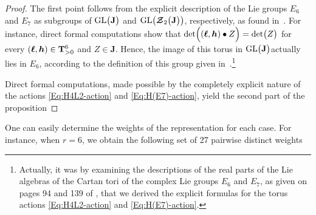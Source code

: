 \documentclass[11pt]{amsart}
\begin{document}
\begin{proof}%
The first point follows from the explicit description of the Lie groups $E_6 $ and $E_7$ as subgroups of 
${\rm GL}\big( \mathbf J\big)$  and 
${\rm GL}\big( \boldsymbol{\mathcal Z}_2\big(\mathbf J\big)\big)$, respectively, as found in~\cite{Yokota}. For instance, direct formal computations show that
$
{\rm det}\Big((\boldsymbol{\ell},\boldsymbol{h} )\bullet Z\Big)={\rm det}\big( 
Z\big)$ for every $(\boldsymbol{\ell},\boldsymbol{h} )\in {\bf T}_{>0}^6$ and $Z\in \mathbf J$. Hence, the image of this torus in ${\rm GL}\big( \mathbf J\big)$actually lies in $E_6$, according to the definition of this group given in~\cite[\S3.1]{Yokota}.\footnote{Actually, it was by examining the descriptions of the real parts of the Lie algebras of the Cartan tori of the complex Lie groups $ E_6$ and $ E_7$, as given on pages 94 and 139 of \cite{Yokota}, that we derived the explicit formulas for the torus actions \eqref{Eq:H4L2-action} 
and 
\eqref{Eq:H(E7)-action}.}



Direct formal computations, made possible by the completely explicit nature of the actions 
\eqref{Eq:H4L2-action} 
and \eqref{Eq:H(E7)-action}, yield the second part of the proposition
\end{proof}%

 One can easily determine the weights of the representation for each case.
For instance, when $r=6$, we obtain the following set of 27 pairwise distinct weights
\end{document}
